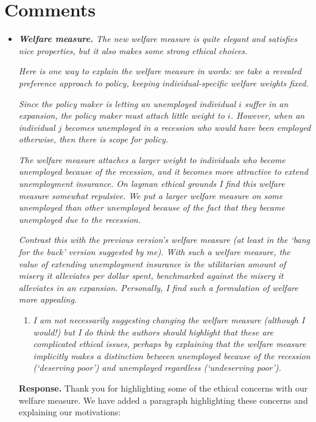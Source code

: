 \documentclass[12pt,letterpaper,english]{article}
\begin{document}
\section{Comments}
\begin{itemize}

	\item \textit{\textbf{Welfare measure.} The new welfare measure is quite elegant and satisfies nice properties, but it also makes some strong ethical choices.}
		
	\textit{Here is one way to explain the welfare measure in words: we take a revealed preference approach to policy, keeping individual-specific welfare weights fixed.}
		
	\textit{Since the policy maker is letting an unemployed individual $i$ suffer in an expansion, the policy maker must attach little weight to $i$. However, when an individual $j$ becomes unemployed in a recession who would have been	employed otherwise, then there is scope for policy.}
	
	\textit{The welfare measure attaches a larger weight to individuals who become unemployed because of the recession, and it becomes more attractive to extend unemployment insurance. On layman ethical grounds I find this welfare measure somewhat repulsive. We put a larger welfare measure on some unemployed than other unemployed because of the fact that they became unemployed due to the recession.}
	
	\textit{Contrast this with the previous version’s welfare measure (at least in the ‘bang for the buck’ version suggested by me). With such a welfare measure, the value of extending unemployment insurance is the utilitarian amount of misery it alleviates per dollar spent, benchmarked against the misery it alleviates in an expansion. Personally, I find such a formulation of welfare more appealing.}

	\begin{enumerate}
		\item \textit{I am not necessarily suggesting changing the welfare measure (although I would!) but I do think the authors should highlight that these are complicated ethical issues, perhaps by explaining that the welfare measure implicitly makes a distinction between unemployed because of the recession (‘deserving poor’) and unemployed regardless (‘undeserving poor’).}
	\end{enumerate}
	
	\noindent \textbf{Response.} Thank you for highlighting some of the ethical concerns with our welfare measure. We have added a paragraph highlighting these concerns and explaining our motivations:
	

\end{itemize}
\end{document}
